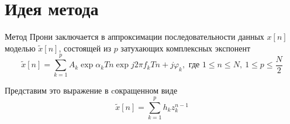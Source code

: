 \documentclass[a4paper,14pt]{extarticle}
\renewcommand*{\phi}{\varphi}
\begin{document}




        



\section{Идея метода}%
\label{sec:ideia_metoda}


Метод Прони заключается в аппроксимации последовательности данных $x[n]$
моделью $\tilde x[n]$,
состоящей из $p$ затухающих комплексных экспонент
\begin{equation}
    \tilde x[n] = \sum\limits_{k=1}^{p} A_k\exp{\alpha_k Tn} \exp{j2\pi f_k Tn
    +j\phi_k}, \text{ где } 1\leq n\leq N,~ 1\leq p \leq \frac{N}{2}
\end{equation}

Представим это выражение в cокращенном виде
\begin{equation}
    \label{eq:}
    \tilde x[n] = \sum\limits_{k=1}^{p} h_k z_{k}^{n-1}
\end{equation}
\end{document}
